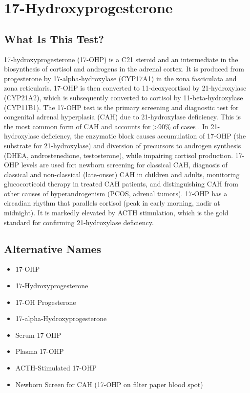 \chapter{17-Hydroxyprogesterone}

\section*{What Is This Test?}
17-hydroxyprogesterone (17-OHP) is a C21 steroid and an intermediate in the biosynthesis of cortisol and androgens in the adrenal cortex. It is produced from progesterone by 17-alpha-hydroxylase (CYP17A1) in the zona fasciculata and zona reticularis. 17-OHP is then converted to 11-deoxycortisol by 21-hydroxylase (CYP21A2), which is subsequently converted to cortisol by 11-beta-hydroxylase (CYP11B1). The 17-OHP test is the primary screening and diagnostic test for congenital adrenal hyperplasia (CAH) due to 21-hydroxylase deficiency. This is the most common form of CAH and accounts for >90\% of cases \cite{speiser2018congenital}. In 21-hydroxylase deficiency, the enzymatic block causes accumulation of 17-OHP (the substrate for 21-hydroxylase) and diversion of precursors to androgen synthesis (DHEA, androstenedione, testosterone), while impairing cortisol production. 17-OHP levels are used for: newborn screening for classical CAH, diagnosis of classical and non-classical (late-onset) CAH in children and adults, monitoring glucocorticoid therapy in treated CAH patients, and distinguishing CAH from other causes of hyperandrogenism (PCOS, adrenal tumors). 17-OHP has a circadian rhythm that parallels cortisol (peak in early morning, nadir at midnight). It is markedly elevated by ACTH stimulation, which is the gold standard for confirming 21-hydroxylase deficiency.

\section*{Alternative Names}
\begin{itemize}
  \item 17-OHP
  \item 17-Hydroxyprogesterone
  \item 17-OH Progesterone
  \item 17-alpha-Hydroxyprogesterone
  \item Serum 17-OHP
  \item Plasma 17-OHP
  \item ACTH-Stimulated 17-OHP
  \item Newborn Screen for CAH (17-OHP on filter paper blood spot)
\end{itemize}
